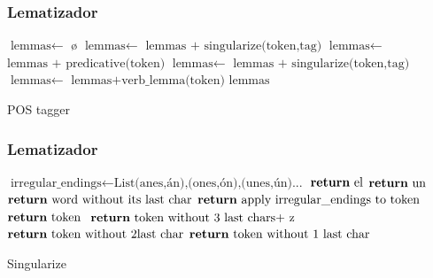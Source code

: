 \documentclass{beamer}
\begin{document}
\begin{frame}
\frametitle{Lematizador}
\begin{algorithm}[H]
\begin{scriptsize}
    \begin{algorithmic}[1]
    \State $\text{lemmas} \gets$ \o
	 	 $\text{lemmas} \gets$ $\text{lemmas + singularize(token,tag)}$ \EndIf 
	 	 $\text{lemmas} \gets$ $\text{lemmas + predicative(token)}$ \EndIf
	 	 $\text{lemmas} \gets$ $\text{lemmas + singularize(token,tag)}$ \EndIf 
	 	 $\text{lemmas} \gets$ $\text{lemmas+verb\_lemma(token)}$ \EndIf 
            \EndFor
            \State \Return $\text{lemmas}$   
        \EndProcedure
    \end{algorithmic}
    \label{alg:rAP}
    \caption{POS tagger}
    \end{scriptsize}
\end{algorithm}
\end{frame}

\begin{frame}
\frametitle{Lematizador}
\begin{algorithm}[H]
\begin{scriptsize}
    \begin{algorithmic}[1]
    \State $\text{irregular\_endings} \gets \text{List(anes,án),(ones,ón),(unes,ún)...}$
	 	 $\text{\Return el}$ \EndIf
	 	 $\text{\Return un}$ \EndIf \EndIf
	 \State $\text{\Return word without its last char}$ \EndIf
	   \State $\text{\Return apply irregular\_endings to token }$ \EndIf
	   \State $\text{\Return token }$ \EndIf
	   \State $\text{\Return token without 3 last chars+ z }$ \EndIf
	   \State $\text{\Return token without 2last char}$ \EndIf
	   \State $\text{\Return token without 1 last char}$ \EndIf
        \EndProcedure
    \end{algorithmic}
    \label{alg:rAP}
    \caption{Singularize}
    \end{scriptsize}
\end{algorithm}
\end{frame}
\end{document}
